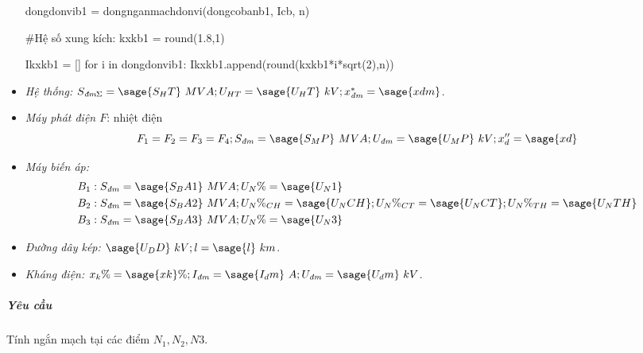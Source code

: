 \documentclass[12pt,a4paper]{article}
\newcommand{\viss}[1]{#1_\text{\textit{đm}}} %
\newcommand{\vidss}[2]{#1_\text{\textit{đm#2}}}
\newcommand{\unit}[1]{~#1}							%
\begin{document}
\begin{itemize}
\begin{sagesilent}
dongdonvib1 = dongnganmachdonvi(dongcobanb1, Icb, n)

#Hệ số xung kích: 
kxkb1 = round(1.8,1)

Ikxkb1 = []
for i in dongdonvib1:
  Ikxkb1.append(round(kxkb1*i*sqrt(2),n))
\end{sagesilent} 

\item \textit{Hệ thống:} $\vidss{S}{$\Sigma$} = \sage{S_HT} \unit{MVA}; U_{HT} = \sage{U_HT} \unit{kV}; \viss{x}^\ast = \sage{xdm}$.
\item \textit{Máy phát điện $F$}: nhiệt điện $$F_1 = F_2 = F_3 = F_4; \viss{S} = \sage{S_MP} \unit{MVA}; \viss{U} = \sage{U_MP} \unit{kV}; x_d^{\prime \prime} = \sage{xd}$$
\item \textit{Máy biến áp:}
\begin{equation*}
\begin{split}
B_1 &: \viss{S} = \sage{S_BA1}\unit{MVA}; U_N\% =  \sage{U_N1}\\
B_2 &: \viss{S} =  \sage{S_BA2} \unit{MVA}; U_N\%_{CH} = \sage{U_NCH}; U_N\%_{CT} = \sage{U_NCT}; U_N\%_{TH} = \sage{U_NTH}\\
B_3 &: \viss{S} =  \sage{S_BA3} \unit{MVA}; U_N\% = \sage{U_N3}
\end{split}
\end{equation*}
\item  \textit{Đường dây kép:} $\sage{U_DD}\unit{kV};l = \sage{l} \unit{km}$.
\item \textit{Kháng điện:} $x_k \%= \sage{xk}\%; \viss{I}=\sage{I_dm}\unit{A}; \viss{U} = \sage{U_dm} \unit{kV}$.
\end{itemize}

\subparagraph{Yêu cầu} Tính ngắn mạch tại các điểm $N_1,N_2,N3$.
\end{document}

